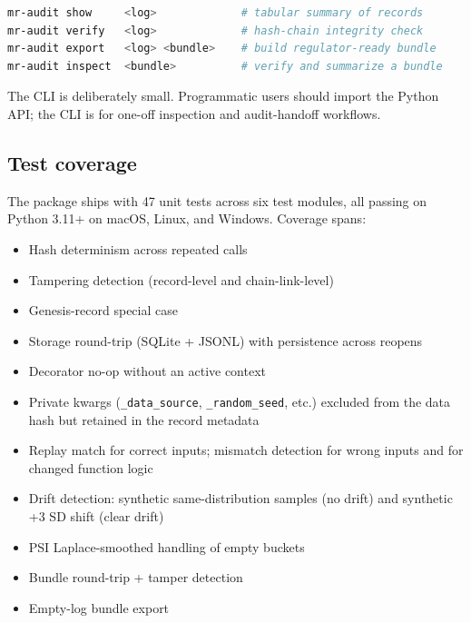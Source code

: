 \begin{lstlisting}[language=bash]
mr-audit show     <log>             # tabular summary of records
mr-audit verify   <log>             # hash-chain integrity check
mr-audit export   <log> <bundle>    # build regulator-ready bundle
mr-audit inspect  <bundle>          # verify and summarize a bundle
\end{lstlisting}

The CLI is deliberately small. Programmatic users should import the Python API; the CLI is for one-off inspection and audit-handoff workflows.

\subsection{Test coverage}\label{sec:tests}

The package ships with 47 unit tests across six test modules, all passing on Python 3.11+ on macOS, Linux, and Windows. Coverage spans:

\begin{itemize}[leftmargin=*]
    \item Hash determinism across repeated calls
    \item Tampering detection (record-level and chain-link-level)
    \item Genesis-record special case
    \item Storage round-trip (SQLite + JSONL) with persistence across reopens
    \item Decorator no-op without an active context
    \item Private kwargs (\texttt{\_data\_source}, \texttt{\_random\_seed}, etc.) excluded from the data hash but retained in the record metadata
    \item Replay match for correct inputs; mismatch detection for wrong inputs and for changed function logic
    \item Drift detection: synthetic same-distribution samples (no drift) and synthetic +3 SD shift (clear drift)
    \item PSI Laplace-smoothed handling of empty buckets
    \item Bundle round-trip + tamper detection
    \item Empty-log bundle export
\end{itemize}
